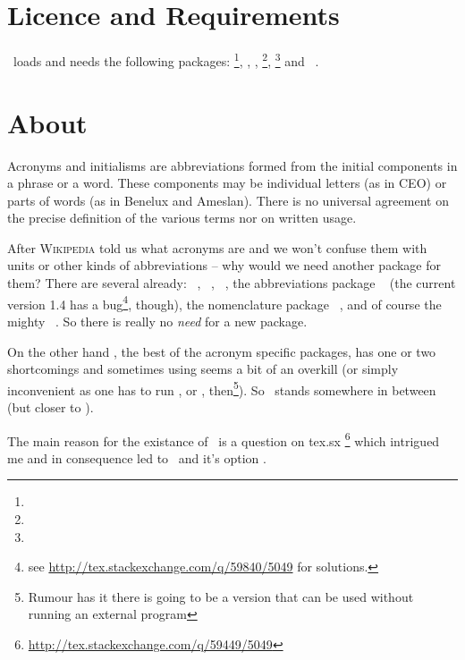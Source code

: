\documentclass[load-preamble+]{cnltx-doc}
\newcommand*\wikipedia{%
\textsc{Wikipedia}}
\begin{document}
\section{Licence and Requirements}
\license

\acro\ loads and needs the following packages:
\footnote{}, , ,
\footnote{},
\footnote{} and
~\cite{pkg:translations}.

\section{About}
\begin{cnltxquote}
  Acronyms and initialisms are abbreviations formed from the initial
  components in a phrase or a word.  These components may be individual
  letters (as in CEO) or parts of words (as in Benelux and Ameslan).  There is
  no universal agreement on the precise definition of the various terms nor on
  written usage.
\end{cnltxquote}
After \wikipedia{} told us what acronyms are and we won't confuse them with
units or other kinds of abbreviations -- why would we need another package for
them?  There are several already: ~\cite{pkg:acronym},
~\cite{pkg:acromake}, ~\cite{pkg:acroterm}, the
abbreviations package ~\cite{pkg:abbrevs} (the current version
1.4 has a bug\footnote{see \url{http://tex.stackexchange.com/q/59840/5049} for
  solutions.}, though), the nomenclature package
~\cite{pkg:nomencl}, and of course the mighty
~\cite{pkg:glossaries}. So there is really no \emph{need} for
a new package.

On the other hand , the best of the acronym specific packages,
has one or two shortcomings and sometimes using  seems a bit
of an overkill (or simply inconvenient as one has to run
,  or , then\footnote{Rumour
  has it there is going to be a version that can be used without running an
  external program}). So \acro\ stands somewhere in between (but closer to
).

The main reason for the existance of \acro\ is a question on \acs{tex.sx}%
\footnote{\url{http://tex.stackexchange.com/q/59449/5049}} which intrigued me
and in consequence led to \acro\ and it's option .
\end{document}
